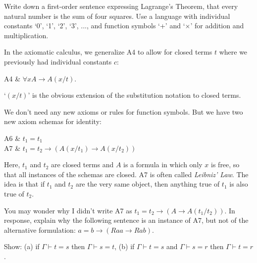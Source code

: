 \begin{exercise}
  Write down a first-order sentence expressing Lagrange's Theorem,
  that every natural number is the sum of four squares.
  Use a language with individual constants `0', `1', `2', `3', ...,
  and function symbols `+' and `$\times$' for addition and multiplication.
\end{exercise}


In the axiomatic calculus,
we generalize A4 to allow for closed terms $t$ where we previously had individual constants $c$:
%
\begin{axioms}
  A4 & $\forall x A \to A(x/t)$.
\end{axioms}
%
\noindent%
`$(x/t)$' is the obvious extension of the substitution notation to closed terms.

We don't need any new axioms or rules for function symbols.
But we have two new axiom schemas for identity:

\begin{axioms}
A6 & $t_1=t_1$\\
A7 & $t_1 = t_2 \to (A(x/t_1 )\to A(x/t_2))$
\end{axioms}
\noindent%
Here,
$t_1$ and $t_2$ are closed terms and $A$ is a formula in which only $x$ is free,
so that all instances of the schemas are closed.
A7 is often called \emph{Leibniz' Law}.
The idea is that if $t_1$ and $t_2$ are the very same object,
then anything true of $t_1$ is also true of $t_2$.

\begin{exercise}
  You may wonder why I didn't write A7 as ${t_1 = t_2} \to (A \to A(t_1/t_2))$.
  In response,
  explain why the following sentence is an instance of A7,
  but not of the alternative formulation:
  ${a=b} \to (Raa \to Rab)$.
\end{exercise}

\begin{exercise}\label{ex:identity}
  Show: \; (a) if $\Gamma \vdash t=s$ then $\Gamma \vdash s=t$,\;
  (b) if $\Gamma \vdash t=s$ and $\Gamma \vdash s=r$ then $\Gamma \vdash t=r$.
\end{exercise}

